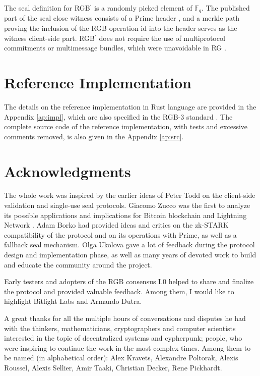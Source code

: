 \documentclass[9pt,oneside]{amsart}
\def\bitcoin{%
  \leavevmode
  \vtop{\offinterlineskip %
    \setbox0=\hbox{B}%
    \setbox2=\hbox to\wd0{\hfil\hskip-.03em
    \vrule height .3ex width .15ex\hskip .08em
    \vrule height .3ex width .15ex\hfil}
    \vbox{\copy2\box0}\box2}}
\begin{document}
\begin{multicols}{2}
The seal definition for RGB$^\prime$ is a randomly picked element of $\mathbb{F}_q$.
The published part of the seal close witness consists of a Prime header \cite{Prime},
and a merkle path proving the inclusion of the RGB operation id into the header
serves as the witness client-side part.
RGB$^\prime$ does not require the use of multiprotocol commitments or multimessage bundles,
which were unavoidable in RG\bitcoin.

\section{Reference Implementation}

The details on the reference implementation in Rust language are provided in the Appendix \ref{ap:impl},
which are also specified in the RGB-3 standard \cite{RGB3}.
The complete source code of the reference implementation, with tests and excessive comments removed,
is also given in the Appendix \ref{ap:src}.


\section{Acknowledgments}
The whole work was inspired by the earlier ideas of Peter Todd
on the client-side validation \cite{CSV} and single-use seal \cite{SUS1, SUS2} protocols.
Giacomo Zucco was the first to analyze its possible applications and
implications for Bitcoin blockchain and Lightning Network \cite{Zucco}.
Adam Borko had provided ideas and critics on the zk-STARK compatibility of the protocol and
on its operations with Prime, as well as a fallback seal mechanism.
Olga Ukolova gave a lot of feedback during the protocol design and implementation phase,
as well as many years of devoted work to build and educate the community around the project.

Early testers and adopters of the RGB consensus I.0 helped to share and finalize the protocol
and provided valuable feedback.
Among them, I would like to highlight Bitlight Labs and Armando Dutra.

A great thanks for all the multiple hours of conversations and disputes he had with
the thinkers, mathematicians, cryptographers and computer scientists
interested in the topic of decentralized systems and cypherpunk;
people, who were inspiring to continue the work in the most complex times.
Among them to be named (in alphabetical order):
Alex Kravets, Alexandre Poltorak, Alexis Roussel, Alexis Sellier,
Amir Taaki, Christian Decker, Rene Pickhardt.


\end{multicols}
\end{document}
